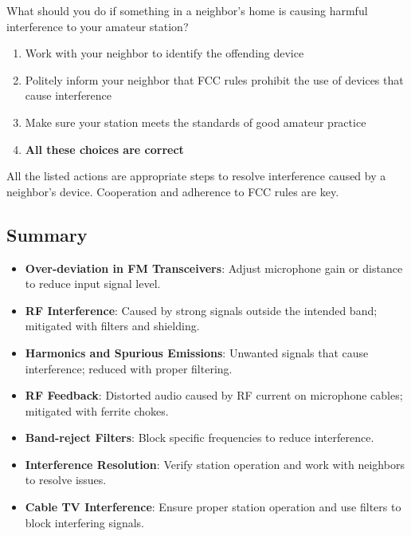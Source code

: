 \begin{tcolorbox}[colback=gray!10!white,colframe=black!75!black,title={T7B08}]
    What should you do if something in a neighbor’s home is causing harmful interference to your amateur station?
    \begin{enumerate}[label=\Alph*,noitemsep]
        \item Work with your neighbor to identify the offending device
        \item Politely inform your neighbor that FCC rules prohibit the use of devices that cause interference
        \item Make sure your station meets the standards of good amateur practice
        \item \textbf{All these choices are correct}
    \end{enumerate}
\end{tcolorbox}
All the listed actions are appropriate steps to resolve interference caused by a neighbor's device. Cooperation and adherence to FCC rules are key.


\subsection*{Summary}
\begin{itemize}
    \item \textbf{Over-deviation in FM Transceivers}: Adjust microphone gain or distance to reduce input signal level.
    \item \textbf{RF Interference}: Caused by strong signals outside the intended band; mitigated with filters and shielding.
    \item \textbf{Harmonics and Spurious Emissions}: Unwanted signals that cause interference; reduced with proper filtering.
    \item \textbf{RF Feedback}: Distorted audio caused by RF current on microphone cables; mitigated with ferrite chokes.
    \item \textbf{Band-reject Filters}: Block specific frequencies to reduce interference.
    \item \textbf{Interference Resolution}: Verify station operation and work with neighbors to resolve issues.
    \item \textbf{Cable TV Interference}: Ensure proper station operation and use filters to block interfering signals.
\end{itemize}
